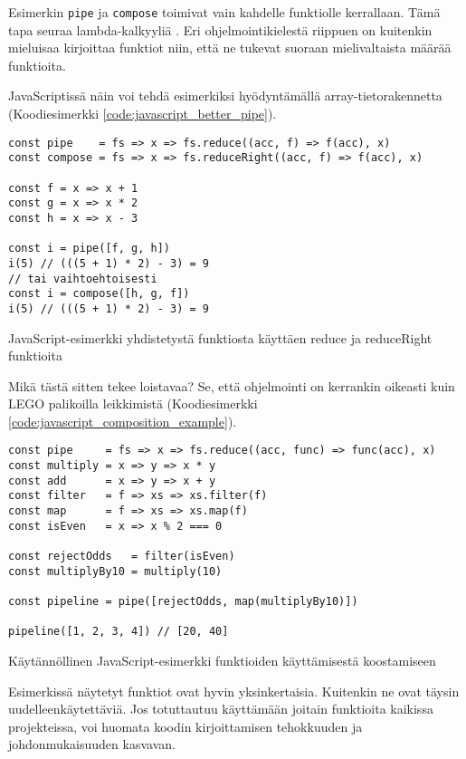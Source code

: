 Esimerkin \texttt{pipe} ja \texttt{compose} toimivat vain kahdelle funktiolle kerrallaan. Tämä tapa seuraa lambda-kalkyyliä \cite{computerphile_lambda}. Eri ohjelmointikielestä riippuen on kuitenkin mieluisaa kirjoittaa funktiot niin, että ne tukevat suoraan mielivaltaista määrää funktioita.

JavaScriptissä näin voi tehdä esimerkiksi hyödyntämällä array-tietorakennetta (Koodiesimerkki \ref{code:javascript_better_pipe}).

\begin{code}
	\begin{verbatim}
const pipe    = fs => x => fs.reduce((acc, f) => f(acc), x)
const compose = fs => x => fs.reduceRight((acc, f) => f(acc), x)

const f = x => x + 1
const g = x => x * 2
const h = x => x - 3

const i = pipe([f, g, h])
i(5) // (((5 + 1) * 2) - 3) = 9
// tai vaihtoehtoisesti 
const i = compose([h, g, f])
i(5) // (((5 + 1) * 2) - 3) = 9
\end{verbatim}
	\caption{JavaScript-esimerkki yhdistetystä funktiosta käyttäen reduce ja reduceRight funktioita}
	\label{code:javascript_better_pipe}
\end{code}

Mikä tästä sitten tekee loistavaa? Se, että ohjelmointi on kerrankin oikeasti kuin LEGO palikoilla leikkimistä (Koodiesimerkki \ref{code:javascript_composition_example}).

\begin{code}
	\begin{verbatim}
const pipe     = fs => x => fs.reduce((acc, func) => func(acc), x)
const multiply = x => y => x * y
const add      = x => y => x + y
const filter   = f => xs => xs.filter(f)
const map      = f => xs => xs.map(f)
const isEven   = x => x % 2 === 0

const rejectOdds   = filter(isEven)
const multiplyBy10 = multiply(10)

const pipeline = pipe([rejectOdds, map(multiplyBy10)])

pipeline([1, 2, 3, 4]) // [20, 40]

\end{verbatim}
	\caption{Käytännöllinen JavaScript-esimerkki funktioiden käyttämisestä koostamiseen}
	\label{code:javascript_composition_example}
\end{code}

Esimerkissä näytetyt funktiot ovat hyvin yksinkertaisia. Kuitenkin ne ovat täysin uudelleenkäytettäviä. Jos totuttautuu käyttämään joitain funktioita kaikissa projekteissa, voi huomata koodin kirjoittamisen tehokkuuden ja johdonmukaisuuden kasvavan.

